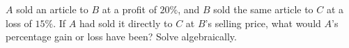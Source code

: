 $A$ sold an article to $B$ at a profit of $20\%$, and $B$ sold the same article to $C$ at a loss of $15\%$. If $A$ had sold it directly to $C$ at $B$'s selling price, what would $A$'s percentage gain or loss have been? Solve algebraically.
